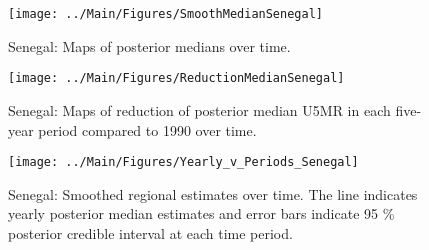 \documentclass[12pt]{article}\usepackage[]{graphicx}\usepackage[]{color}
\newenvironment{knitrout}{}{} %
\begin{document}
\begin{knitrout}
\color{fgcolor}\begin{figure}[bht]

{\centering \texttt{[image: ../Main/Figures/SmoothMedianSenegal]} 

}

\caption[Senegal]{Senegal: Maps of posterior medians over time.}\label{fig:unnamed-chunk-284}
\end{figure}


\end{knitrout}
\begin{knitrout}
\color{fgcolor}\begin{figure}[bht]

{\centering \texttt{[image: ../Main/Figures/ReductionMedianSenegal]} 

}

\caption[Senegal]{Senegal: Maps of reduction of posterior median U5MR in each five-year period compared to 1990 over time.}\label{fig:unnamed-chunk-285}
\end{figure}


\end{knitrout}
\begin{knitrout}
\color{fgcolor}\begin{figure}[bht]

{\centering \texttt{[image: ../Main/Figures/Yearly\_v\_Periods\_Senegal]} 

}

\caption[Senegal]{Senegal: Smoothed regional estimates over time. The line indicates yearly posterior median estimates and error bars indicate 95 \% posterior credible interval at each time period.}\label{fig:unnamed-chunk-286}
\end{figure}


\end{knitrout}
\end{document}
